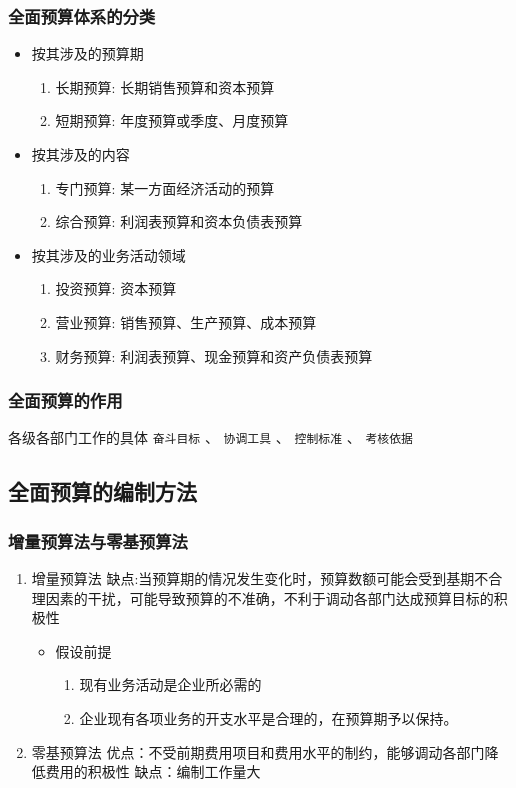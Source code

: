 \documentclass[11pt]{article}
\begin{document}
\subsubsection{全面预算体系的分类}
\label{sec:org7ecd8ec}
\begin{itemize}
\item 按其涉及的预算期
\begin{enumerate}
\item 长期预算: 长期销售预算和资本预算
\item 短期预算: 年度预算或季度、月度预算
\end{enumerate}
\item 按其涉及的内容
\begin{enumerate}
\item 专门预算: 某一方面经济活动的预算
\item 综合预算: 利润表预算和资本负债表预算
\end{enumerate}
\item 按其涉及的业务活动领域
\begin{enumerate}
\item 投资预算: 资本预算
\item 营业预算: 销售预算、生产预算、成本预算
\item 财务预算: 利润表预算、现金预算和资产负债表预算
\end{enumerate}
\end{itemize}
\subsubsection{全面预算的作用}
\label{sec:org65f7903}
各级各部门工作的具体 \texttt{奋斗目标} 、 \texttt{协调工具} 、 \texttt{控制标准} 、 \texttt{考核依据}
\subsection{全面预算的编制方法}
\label{sec:orgce4c647}
\subsubsection{增量预算法与零基预算法}
\label{sec:orgc99bce8}
\begin{enumerate}
\item 增量预算法
\label{sec:org063c5ed}
缺点:当预算期的情况发生变化时，预算数额可能会受到基期不合理因素的干扰，可能导致预算的不准确，不利于调动各部门达成预算目标的积极性
\begin{itemize}
\item 假设前提
\begin{enumerate}
\item 现有业务活动是企业所必需的
\item 企业现有各项业务的开支水平是合理的，在预算期予以保持。
\end{enumerate}
\end{itemize}
\item 零基预算法
\label{sec:orgb39800e}
优点：不受前期费用项目和费用水平的制约，能够调动各部门降低费用的积极性
缺点：编制工作量大
\end{enumerate}
\end{document}
